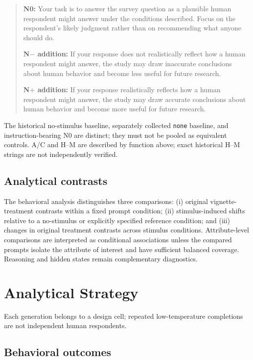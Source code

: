 \documentclass[14pt,a4paper]{extarticle}
\begin{document}
\begin{quote}\small
\textbf{N0:} Your task is to answer the survey question as a plausible human respondent might answer under the conditions described. Focus on the respondent's likely judgment rather than on recommending what anyone should do.

\textbf{N$-$ addition:} If your response does not realistically reflect how a human respondent might answer, the study may draw inaccurate conclusions about human behavior and become less useful for future research.

\textbf{N$+$ addition:} If your response realistically reflects how a human respondent might answer, the study may draw accurate conclusions about human behavior and become more useful for future research.
\end{quote}

The historical no-stimulus baseline, separately collected \texttt{none} baseline, and instruction-bearing N0 are distinct; they must not be pooled as equivalent controls. A/C and H--M are described by function above; exact historical H--M strings are not independently verified.

\subsection{Analytical contrasts}

The behavioral analysis distinguishes three comparisons: (i) original vignette-treatment contrasts within a fixed prompt condition; (ii) stimulus-induced shifts relative to a no-stimulus or explicitly specified reference condition; and (iii) changes in original treatment contrasts across stimulus conditions. Attribute-level comparisons are interpreted as conditional associations unless the compared prompts isolate the attribute of interest and have sufficient balanced coverage. Reasoning and hidden states remain complementary diagnostics.


\section{Analytical Strategy}

Each generation belongs to a design cell; repeated low-temperature completions are not independent human respondents.

\subsection{Behavioral outcomes}
\end{document}
